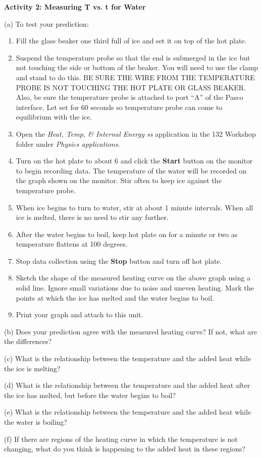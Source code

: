 \newpage

\textbf{Activity 2: Measuring T vs. t for Water} 

(a) To test your prediction: 

\begin{enumerate}
\item Fill the glass beaker one third full of ice and set it on top of the hot plate.
\item Suspend the temperature probe so that the end is submerged in the ice but not touching the side or bottom of the beaker. You will need to use the clamp and stand to do this. BE SURE THE WIRE FROM THE TEMPERATURE PROBE IS NOT TOUCHING THE HOT PLATE OR GLASS BEAKER. Also, be sure the temperature probe is attached to port ``A'' of the Pasco interface. Let set for 60 seconds so temperature probe can come to equilibrium with the ice.
\item Open the \textit{Heat, Temp, \& Internal Energy ss} application in the
132 Workshop folder under \textit{Physics applications}.
\item Turn on the hot plate to about 6 and click the
\textbf{Start} button on the monitor to begin recording data. The temperature of the water will be recorded on the graph shown on the monitor. Stir often to keep ice against the temperature probe.
\item When ice begins to turn to water, stir at about 1 minute intervals. When all ice is melted, there is no need to stir any further.
\item After the water begins to boil, keep hot plate on for a minute or two as temperature flattens at 100 degrees.
\item Stop data collection using the \textbf{Stop} button and turn off hot plate.
\item Sketch the shape of the measured heating curve on the above graph
using a solid line. Ignore small variations due to noise and uneven
heating. Mark the points at which the ice has melted and the water
begins to boil.
\item Print your graph and attach to this unit.
\end{enumerate}
(b) Does your prediction agree with the measured heating curve? If
not, what are the differences?
\vspace{15mm}

(c) What is the relationship between the temperature and the added
heat while the ice is melting?
\vspace{15mm}

(d) What is the relationship between the temperature and the added
heat after the ice has melted, but before the water begins to boil?
\vspace{15mm}

(e) What is the relationship between the temperature and the added
heat while the water is boiling?
\vspace{15mm}

(f) If there are regions of the heating curve in which the temperature
is not changing, what do you think is happening to the added heat
in these regions?\vspace{20mm}

